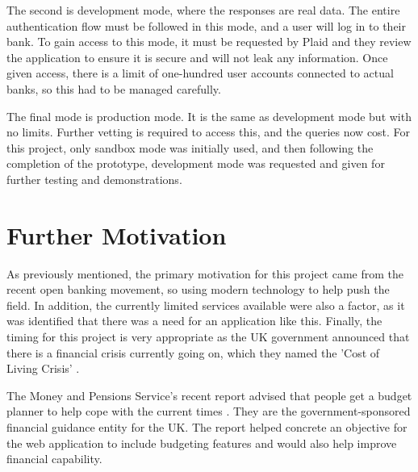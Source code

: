 The second is development mode, where the responses are real data. The entire authentication flow must be followed in this mode, and a user will log in to their bank. To gain access to this mode, it must be requested by Plaid and they review the application to ensure it is secure and will not leak any information. Once given access, there is a limit of one-hundred user accounts connected to actual banks, so this had to be managed carefully.

The final mode is production mode. It is the same as development mode but with no limits. Further vetting is required to access this, and the queries now cost. For this project, only sandbox mode was initially used, and then following the completion of the prototype, development mode was requested and given for further testing and demonstrations.

\section{Further Motivation}
\label{sec:further-motivation}
As previously mentioned, the primary motivation for this project came from the recent open banking movement, so using modern technology to help push the field. In addition, the currently limited services available were also a factor, as it was identified that there was a need for an application like this. Finally, the timing for this project is very appropriate as the UK government announced that there is a financial crisis currently going on, which they named the 'Cost of Living Crisis' \cite{CostOfLivingCrisisGov}.

The Money and Pensions Service's recent report advised that people get a budget planner to help cope with the current times \cite{MaPS}. They are the government-sponsored financial guidance entity for the UK. The report helped concrete an objective for the web application to include budgeting features and would also help improve financial capability.